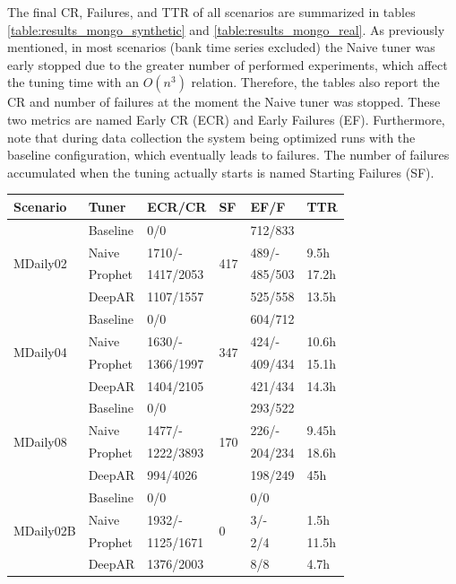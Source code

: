 \documentclass[a4paper, 12pt]{article} %
\newcommand{\ra}[1]{\renewcommand{\arraystretch}{#1}}
\begin{document}
	The final CR, Failures, and TTR of all scenarios are summarized in tables \ref{table:results_mongo_synthetic} and \ref{table:results_mongo_real}. As previously mentioned, in most scenarios (bank time series excluded) the Naive tuner was early stopped due to the greater number of performed experiments, which affect the tuning time with an $O(n^3)$ relation. Therefore, the tables also report the CR and number of failures at the moment the Naive tuner was stopped. These two metrics are named Early CR (ECR) and Early Failures (EF). Furthermore, note that during data collection the system being optimized runs with the baseline configuration, which eventually leads to failures. The number of failures accumulated when the tuning actually starts is named Starting Failures (SF).

	\begin{table}\centering 
		\ra{1.3}
		\begin{tabularx}{\textwidth}{@{}XXXXXX@{}}
			\toprule
			Scenario & Tuner & ECR/CR & SF & EF/F & TTR\\
			
			\midrule
			\multirow{4}{*}{MDaily02}
			& Baseline & 0/0 & \multirow{4}{*}{417} & 712/833 & \\
			& Naive & 1710/-  && 489/- & 9.5h \\
			& Prophet & 1417/2053 && 485/503 & 17.2h\\
			& DeepAR & 1107/1557 && 525/558 & 13.5h\\
			
			
			\midrule
			\multirow{4}{*}{MDaily04}
			& Baseline & 0/0 & \multirow{4}{*}{347}  & 604/712 & \\
			& Naive & 1630/- && 424/- & 10.6h \\
			& Prophet & 1366/1997 && 409/434 & 15.1h \\
			& DeepAR & 1404/2105 && 421/434 & 14.3h \\
			
			\midrule
			\multirow{4}{*}{MDaily08}
			& Baseline & 0/0 & \multirow{4}{*}{170} & 293/522 & \\
			& Naive & 1477/- && 226/- & 9.45h\\
			& Prophet & 1222/3893 && 204/234 & 18.6h\\
			& DeepAR & 994/4026 && 198/249 & 45h\\
			
			\midrule
			\multirow{4}{*}{MDaily02B}
			& Baseline & 0/0 & \multirow{4}{*}{0} & 0/0 & \\
			& Naive & 1932/- && 3/- & 1.5h  \\
			& Prophet & 1125/1671 && 2/4 & 11.5h \\
			& DeepAR & 1376/2003 && 8/8 & 4.7h\\
			

\end{tabularx}
\end{table}
\end{document}

